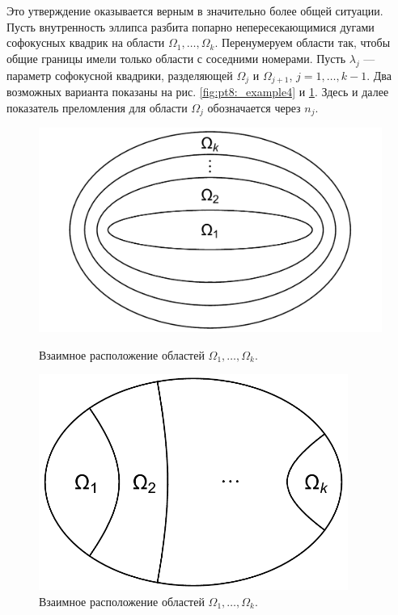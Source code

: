 Это утверждение оказывается верным в значительно более общей ситуации.
Пусть внутренность эллипса разбита попарно непересекающимися дугами софокусных квадрик на области $\Omega_1, \ldots, \Omega_k$.  Перенумеруем области так, чтобы общие границы имели только области с соседними номерами. Пусть $\lambda_j$ --- параметр софокусной квадрики, разделяющей $\Omega_j$ и $\Omega_{j+1}$, $j=1, \ldots, k-1$. Два возможных варианта показаны на рис. \ref{fig:pt8:_example4} и \ref{fig:pt8:_example5}. Здесь и далее показатель преломления для области $\Omega_j$ обозначается через $n_j$.
\begin{figure}[!htb]
   \includegraphics[width=1\textwidth]{images/ch4/section1/multiple ellipses.pdf}
    \caption{Взаимное расположение областей $\Omega_1, \ldots, \Omega_k$.}
    \label{fig:pt8:_example4}
\endminipage\hfill
{}
    \includegraphics[width=0.9\textwidth]{images/ch4/section1/multiple hyperbolas.pdf}   
    \caption{Взаимное расположение областей $\Omega_1, \ldots, \Omega_k$.}
    \label{fig:pt8:_example5}
\endminipage\hfill
\end{figure}


